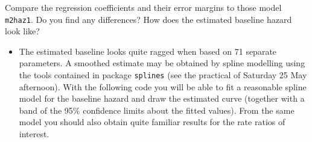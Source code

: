 \documentclass[
]{book}
\newenvironment{Shaded}{\begin{snugshade}}{\end{snugshade}}
\newcommand{\AttributeTok}[1]{\textcolor[rgb]{0.13,0.29,0.53}{#1}}
\newcommand{\CommentTok}[1]{\textcolor[rgb]{0.56,0.35,0.01}{\textit{#1}}}
\newcommand{\DecValTok}[1]{\textcolor[rgb]{0.00,0.00,0.81}{#1}}
\newcommand{\FunctionTok}[1]{\textcolor[rgb]{0.13,0.29,0.53}{\textbf{#1}}}
\newcommand{\NormalTok}[1]{#1}
\newcommand{\OtherTok}[1]{\textcolor[rgb]{0.56,0.35,0.01}{#1}}
\newcommand{\SpecialCharTok}[1]{\textcolor[rgb]{0.81,0.36,0.00}{\textbf{#1}}}
\newcommand{\StringTok}[1]{\textcolor[rgb]{0.31,0.60,0.02}{#1}}
\providecommand{\tightlist}{%
  \setlength{\itemsep}{0pt}\setlength{\parskip}{0pt}}
\begin{document}
\begin{Shaded}
\end{Shaded}

Compare the regression coefficients and their error margins
to those model \texttt{m2haz1}. Do you find any differences?
How does the estimated baseline hazard look like?

\begin{itemize}
\tightlist
\item
  The estimated baseline looks quite ragged when based on 71 separate
  parameters. A smoothed estimate may be obtained by spline modelling using the tools
  contained in package \texttt{splines} (see the practical of Saturday 25 May afternoon).
  With the following code you will be able to fit a
  reasonable spline model for the baseline hazard and
  draw the estimated curve (together with a band of the 95\%
  confidence limits about the fitted values).
  From the same model you should also obtain quite familiar results for the
  rate ratios of interest.
\end{itemize}
\end{document}
